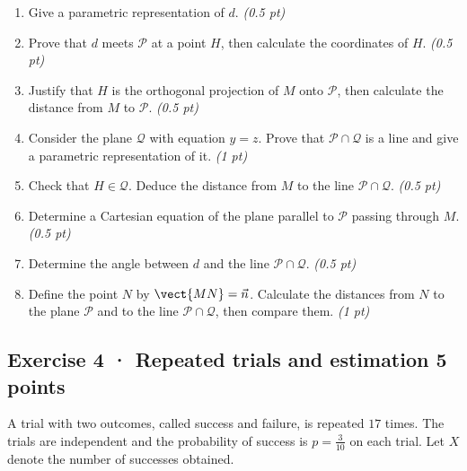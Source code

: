 \begin{enumerate}

\item Give a parametric representation of $d$. \hfill\textit{(0.5 pt)}

\item Prove that $d$ meets $\mathcal P$ at a point $H$, then calculate the coordinates of $H$. \hfill\textit{(0.5 pt)}

\item Justify that $H$ is the orthogonal projection of $M$ onto $\mathcal P$, then calculate the distance from $M$ to $\mathcal P$. \hfill\textit{(0.5 pt)}

\item Consider the plane $\mathcal Q$ with equation $y=z$. Prove that $\mathcal P\cap\mathcal Q$ is a line and give a parametric representation of it. \hfill\textit{(1 pt)}

\item Check that $H\in\mathcal Q$. Deduce the distance from $M$ to the line $\mathcal P\cap\mathcal Q$. \hfill\textit{(0.5 pt)}

\item Determine a Cartesian equation of the plane parallel to $\mathcal P$ passing through $M$. \hfill\textit{(0.5 pt)}

\item Determine the angle between $d$ and the line $\mathcal P\cap\mathcal Q$. \hfill\textit{(0.5 pt)}

\item Define the point $N$ by $\vect{MN}=\vec n$. Calculate the distances from $N$ to the plane $\mathcal P$ and to the line $\mathcal P\cap\mathcal Q$, then compare them. \hfill\textit{(1 pt)}

\end{enumerate}

\subsection*{Exercise 4 · Repeated trials and estimation \hfill 5 points}A trial with two outcomes, called success and failure, is repeated $17$ times. The trials are independent and the probability of success is $p=\frac{3}{10}$ on each trial. Let $X$ denote the number of successes obtained.

